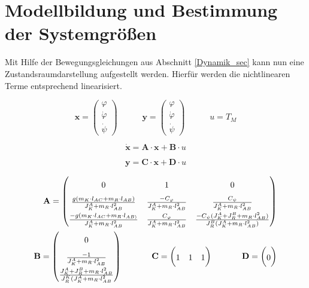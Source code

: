 \section{Modellbildung und Bestimmung der Systemgrößen}
Mit Hilfe der Bewegungsgleichungen aus Abschnitt \ref{Dynamik_sec} kann nun eine Zustandsraumdarstellung aufgestellt werden. Hierfür werden die nichtlinearen Terme entsprechend linearisiert. 

\begin{equation}
\textbf{x} = \begin{pmatrix}
\varphi \\ \dot{\varphi} \\ \dot{\psi}
\end{pmatrix}
\hspace{35pt}
\textbf{y} = \begin{pmatrix}
\varphi \\ \dot{\varphi} \\ \dot{\psi}
\end{pmatrix}
\hspace{35pt}
u = T_M
\end{equation}

\begin{equation}
\dot{\textbf{x}} = \textbf{A} \cdot \textbf{x} + \textbf{B} \cdot u
\end{equation}

\begin{equation}
\textbf{y} = \textbf{C} \cdot \textbf{x} + \textbf{D} \cdot u
\end{equation}

\begin{equation}
\begin{split}
\renewcommand*{\arraystretch}{1.7}
\textbf{A} = \begin{pmatrix}
0 & 1 & 0 \\
\frac{g(m_K \cdot l_{AC} + m_R \cdot l_{AB})}{J^A_K + m_R \cdot l_{AB}^2} &
\frac{-C_{\varphi}}{J^A_K + m_R \cdot l_{AB}^2} & 
\frac{C_{\psi}}{J^A_K + m_R \cdot l_{AB}^2} \\
\frac{-g(m_K \cdot l_{AC} + m_R \cdot l_{AB)}}{J^A_K + m_R \cdot l_{AB}^2} &
\frac{C_{\varphi}}{J^A_K + m_R \cdot l_{AB}^2} &
\frac{-C_{\psi}(J^A_K + J^B_R + m_R \cdot l_{AB}^2)}{J^B_R(J^A_K + m_R \cdot l_{AB}^2)}
\end{pmatrix} 
\\
\renewcommand*{\arraystretch}{1.7}
\textbf{B} = \begin{pmatrix}
0 \\ \frac{-1}{J^A_K + m_R \cdot l_{AB}^2} \\ \frac{J^A_K + J^B_R + m_R \cdot l_{AB}^2}{J^K_R(J^A_K + m_R \cdot l_{AB}^2}
\end{pmatrix}
\hspace{35 pt}
\textbf{C} = \begin{pmatrix}
1 & 1 & 1
\end{pmatrix}
\hspace{35pt}
\textbf{D} = \begin{pmatrix}
0
\end{pmatrix}
\end{split}
\end{equation}